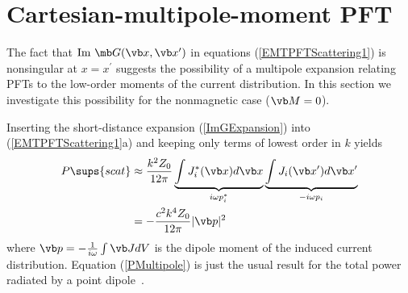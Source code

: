\newpage
\section{Cartesian-multipole-moment PFT}
\label{MomentPFTSection}

The fact that $\text{Im }\mb G(\vb x, \vb x^\prime)$
in equations (\ref{EMTPFTScattering1}) is nonsingular
at $x=x^\prime$ suggests the possibility of a
multipole expansion relating PFTs to the low-order
moments of the current distribution. In this section 
we investigate this possibility for the nonmagnetic
case ($\vb M=0$).

Inserting the short-distance expansion (\ref{ImGExpansion})
into (\ref{EMTPFTScattering1}a) and keeping only terms of lowest
order in $k$ yields
\begin{align}
  P\sups{scat}
&\approx
\frac{k^2 Z_0}{12 \pi}
  \underbrace{ \int J_i^*(\vb x) d\vb x }_{i\omega p^*_i}
  \underbrace{ \int J_i  (\vb x^\prime) d\vb x^\prime }_{-i\omega p_i}
\\
&=-\frac{c^2 k^4 Z_0}{12 \pi}|\vb p|^2
\label{PMultipole}
\end{align}
where $\vb p=-\frac{1}{i\omega} \int \vb J dV$ is the
dipole moment of the induced current distribution.
Equation (\ref{PMultipole}) is just the usual result for 
the total power radiated by a 
point dipole~\cite{Jackson1999}.

